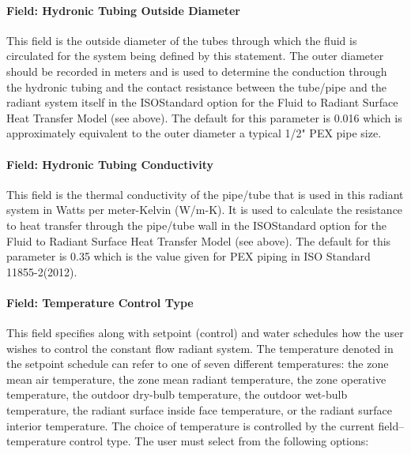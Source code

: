 \paragraph{Field: Hydronic Tubing Outside Diameter}\label{field-hydronic-tubing-outside-diameter-000}

This field is the outside diameter of the tubes through which the fluid is circulated for the system being defined by this statement. The outer diameter should be recorded in meters and is used to determine the conduction through the hydronic tubing and the contact resistance between the tube/pipe and the radiant system itself in the ISOStandard option for the Fluid to Radiant Surface Heat Transfer Model (see above).  The default for this parameter is 0.016 which is approximately equivalent to the outer diameter a typical 1/2" PEX pipe size.



\paragraph{Field: Hydronic Tubing Conductivity}\label{field-hydronic-tubing-conductivity-000}

This field is the thermal conductivity of the pipe/tube that is used in this radiant system in Watts per meter-Kelvin (W/m-K).  It is used to calculate the resistance to heat transfer through the pipe/tube wall in the ISOStandard option for the Fluid to Radiant Surface Heat Transfer Model (see above).  The default for this parameter is 0.35 which is the value given for PEX piping in ISO Standard 11855-2(2012).

\paragraph{Field: Temperature Control Type}\label{field-temperature-control-type}

This field specifies along with setpoint (control) and water schedules how the user wishes to control the constant flow radiant system. The temperature denoted in the setpoint schedule can refer to one of seven different temperatures: the zone mean air temperature, the zone mean radiant temperature, the zone operative temperature, the outdoor dry-bulb temperature, the outdoor wet-bulb temperature, the radiant surface inside face temperature, or the radiant surface interior temperature. The choice of temperature is controlled by the current field--temperature control type. The user must select from the following options:

